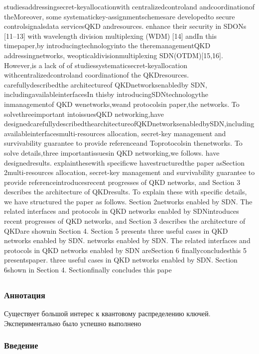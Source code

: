 studiesaddressingsecret-keyallocationwith centralizedcontroland andcoordinationof theMoreover, some systematickey-assignmentschemesare developedto secure controlsignalsdata servicesQKD andresources.
enhance their security in SDONs [11–13] with wavelength division multiplexing (WDM) [14] andIn this timepaper,by introducingtechnologyinto the theremanagementQKD addressingnetworks, weopticaldivisionmultiplexing SDN(OTDM)[15,16]. However,is a lack of of studiessystematicsecret-keyallocation withcentralizedcontroland coordinationof the QKDresources.
carefullydescribedthe architectureof QKDnetworksenabledby SDN, includingavailableinterfacesIn thisby introducingSDNtechnologythe inmanagementof QKD wenetworks,weand protocolsin paper,the networks.
To solvethreeimportant intoissuesQKD networking,have designedcarefullydescribedthearchitectureofQKDnetworksenabledbySDN,includingavailableinterfacesmulti-resources allocation, secret-key management and survivability guarantee to provide referenceand Toprotocolsin thenetworks.
To solve details,three importantissuesin QKD networking,we follows.
have designedresults.
explainthesewith specificwe havestructuredthe paper asSection 2multi-resources allocation, secret-key management and survivability guarantee to provide referenceintroducesrecent progresses of QKD networks, and Section 3 describes the architecture of QKDresults. To explain these with specific details, we have structured the paper as follows. Section 2networks enabled by SDN. The related interfaces and protocols in QKD networks enabled by SDNintroduces recent progresses of QKD networks, and Section 3 describes the architecture of QKDare shownin Section 4. Section 5 presents three useful cases in QKD networks enabled by SDN.
networks enabled by SDN. The related interfaces and protocols in QKD networks enabled by SDN areSection
6
finallyconcludesthis 5 presentspaper. three useful cases in QKD networks enabled by SDN. Section 6shown in Section
4. Sectionfinally concludes this pape

\subsection{\trnas}
\subsubsection*{Аннотация}

Существует большой интерес к квантовому распределению ключей. Экспериментально было успешно выполнено 

\subsubsection{Введение}

